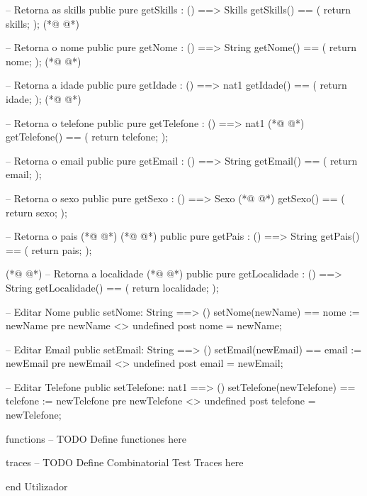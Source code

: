\begin{vdmpp}[breaklines=true]
 -- Retorna as skills
 public pure getSkills : () ==> Skills
 getSkills() ==
 (
  return skills;
 );
(*@
\label{getIdade:86}
@*)
 
 -- Retorna o nome
 public pure getNome : () ==> String
 getNome() ==
 (
  return nome;
 );
(*@
\label{getTelefone:93}
@*)
 
 -- Retorna a idade
 public pure getIdade : () ==> nat1
 getIdade() ==
 (
  return idade;
 );
(*@
\label{getSexo:100}
@*)
 
 -- Retorna o telefone
 public pure getTelefone : () ==> nat1
(*@
\label{getEmail:103}
@*)
 getTelefone() ==
 (
  return telefone;
 );
 
 -- Retorna o email
 public pure getEmail : () ==> String
 getEmail() ==
 (
  return email;
 );
 
 -- Retorna o sexo
 public pure getSexo : () ==> Sexo
(*@
\label{setNome:117}
@*)
 getSexo() ==
 (
  return sexo;
 );
 
 -- Retorna o pais
(*@
\label{setEmail:123}
@*)
(*@
\label{getPais:123}
@*)
 public pure getPais : () ==> String
 getPais() ==
 (
  return pais;
 );
 
(*@
\label{setTelefone:129}
@*)
 -- Retorna a localidade
(*@
\label{getLocalidade:130}
@*)
 public pure getLocalidade : () ==> String
 getLocalidade() ==
 (
  return localidade;
 );
 
 -- Editar Nome
 public setNome: String ==> ()
 setNome(newName) == nome := newName
 pre newName <> undefined
 post nome = newName;
 
 -- Editar Email
 public setEmail: String ==> ()
 setEmail(newEmail) == email := newEmail
 pre newEmail <> undefined
 post email = newEmail;
 
 -- Editar Telefone
 public setTelefone: nat1 ==> ()
 setTelefone(newTelefone) == telefone := newTelefone
 pre newTelefone <> undefined
 post telefone = newTelefone;

functions
-- TODO Define functiones here

traces
-- TODO Define Combinatorial Test Traces here

end Utilizador
\end{vdmpp}
\bigskip

